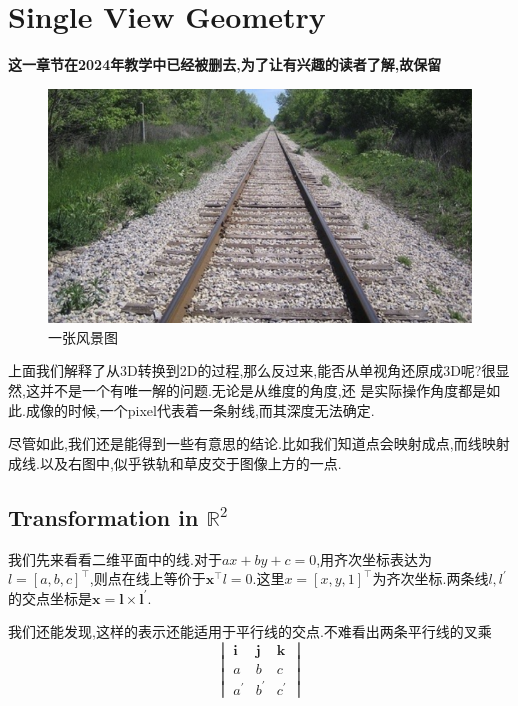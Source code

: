 \section{Single View Geometry}

\textbf{这一章节在2024年教学中已经被删去,为了让有兴趣的读者了解,故保留}

\begin{figure}
	\includegraphics[scale=0.35]{figures/pic_1.png}
	\caption{一张风景图}
\end{figure}
上面我们解释了从3D转换到2D的过程,那么反过来,能否从单视角还原成3D呢?很显然,这并不是一个有唯一解的问题.无论是从维度的角度,还
是实际操作角度都是如此.成像的时候,一个pixel代表着一条射线,而其深度无法确定.

尽管如此,我们还是能得到一些有意思的结论.比如我们知道点会映射成点,而线映射成线.以及右图中,似乎铁轨和草皮交于图像上方的一点.


\subsection{Transformation in $\mathbb R^2$}

我们先来看看二维平面中的线.对于$ax+by+c = 0$,用齐次坐标表达为$l = [a, b, c]^\top$,则点在线上等价于$\bm x^\top l = 0$.这里$x = [x, y, 1]^\top$为齐次坐标.两条线$l, l^\prime$的交点坐标是$\bm x = \bm l \times \bm l^\prime$.

我们还能发现,这样的表示还能适用于平行线的交点.不难看出两条平行线的叉乘
\begin{equation}
	\begin{vmatrix}
		\bm i & \bm j &\bm k
		\\
		a & b & c
		\\
		a^\prime & b^\prime & c^\prime
	\end{vmatrix}
\end{equation}

